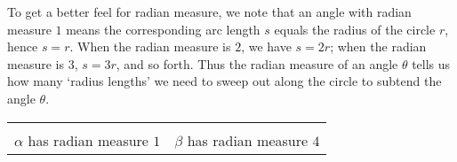 \documentclass[12pt]{ximera}
\begin{document}
To get a better feel for radian measure, we note that an angle with radian measure $1$ means the corresponding arc length $s$ equals the radius of the circle $r$, hence $s = r$.  When the radian measure is $2$, we have $s = 2r$; when the radian measure is $3$, $s = 3r$, and so forth.  Thus the radian measure of an angle $\theta$ tells us how many `radius lengths' we need to sweep out along the circle to subtend the angle $\theta$.


\begin{center}
\begin{tabular}{cc}

 

\hspace{.5in}
& 

  \\


$\alpha$ has radian measure $1$ 
\hspace{.5in}

& $\beta$ has radian measure $4$

\end{tabular}

\end{center}
\end{document}
